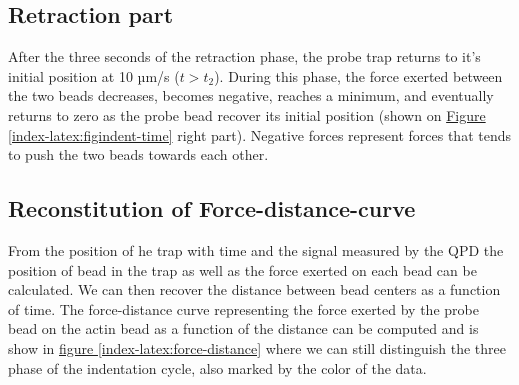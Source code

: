 \documentclass[A4paperpaper,11pt,english]{sphinxmanual}
\begin{document}
\subsection{Retraction part}
\label{index-latex:retraction-part}
After the three seconds of the retraction phase, the probe trap returns to it's
initial position at 10 µm/s (\(t > t_2\)). During this phase, the force
exerted between the two beads decreases, becomes negative, reaches a minimum, and
eventually returns to zero as the probe bead recover its initial
position (shown on \hyperref[index-latex:figindent-time]{Figure  \ref*{index-latex:figindent-time}} right part). Negative forces
represent forces that tends to push the two beads towards each other.


\subsection{Reconstitution of Force-distance-curve}
\label{index-latex:reconstitution-of-force-distance-curve}
From the position of he trap with time and the signal measured by the QPD the
position of bead in the trap as well as the force exerted on each bead can be
calculated. We can then recover the distance between bead centers as a function
of time.  The force-distance curve representing the force exerted by the
probe bead on the actin bead as a function of the distance can be computed and is
show in \hyperref[index-latex:force-distance]{figure  \ref*{index-latex:force-distance}} where we can still distinguish the three
phase of the indentation cycle, also marked by the color of the data.
\end{document}
